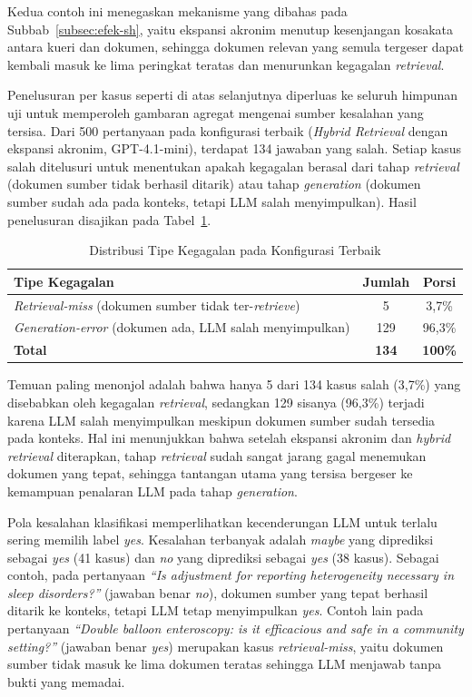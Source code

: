 Kedua contoh ini menegaskan mekanisme yang dibahas pada Subbab~\ref{subsec:efek-sh}, yaitu ekspansi akronim menutup kesenjangan kosakata antara kueri dan dokumen, sehingga dokumen relevan yang semula tergeser dapat kembali masuk ke lima peringkat teratas dan menurunkan kegagalan \textit{retrieval}.

Penelusuran per kasus seperti di atas selanjutnya diperluas ke seluruh himpunan uji untuk memperoleh gambaran agregat mengenai sumber kesalahan yang tersisa. Dari 500 pertanyaan pada konfigurasi terbaik (\textit{Hybrid Retrieval} dengan ekspansi akronim, GPT-4.1-mini), terdapat 134 jawaban yang salah. Setiap kasus salah ditelusuri untuk menentukan apakah kegagalan berasal dari tahap \textit{retrieval} (dokumen sumber tidak berhasil ditarik) atau tahap \textit{generation} (dokumen sumber sudah ada pada konteks, tetapi LLM salah menyimpulkan). Hasil penelusuran disajikan pada Tabel~\ref{tbl:tipe-kegagalan}.

\begin{table}[H]
\centering
\caption{Distribusi Tipe Kegagalan pada Konfigurasi Terbaik}
\label{tbl:tipe-kegagalan}
\begin{tabular}{lcc}
\toprule
\textbf{Tipe Kegagalan} & \textbf{Jumlah} & \textbf{Porsi} \\
\midrule
\textit{Retrieval-miss} (dokumen sumber tidak ter-\textit{retrieve}) & 5 & 3{,}7\% \\
\textit{Generation-error} (dokumen ada, LLM salah menyimpulkan) & 129 & 96{,}3\% \\
\midrule
\textbf{Total} & \textbf{134} & \textbf{100\%} \\
\bottomrule
\end{tabular}
\end{table}

Temuan paling menonjol adalah bahwa hanya 5 dari 134 kasus salah (3{,}7\%) yang disebabkan oleh kegagalan \textit{retrieval}, sedangkan 129 sisanya (96{,}3\%) terjadi karena LLM salah menyimpulkan meskipun dokumen sumber sudah tersedia pada konteks. Hal ini menunjukkan bahwa setelah ekspansi akronim dan \textit{hybrid retrieval} diterapkan, tahap \textit{retrieval} sudah sangat jarang gagal menemukan dokumen yang tepat, sehingga tantangan utama yang tersisa bergeser ke kemampuan penalaran LLM pada tahap \textit{generation}.

Pola kesalahan klasifikasi memperlihatkan kecenderungan LLM untuk terlalu sering memilih label \textit{yes}. Kesalahan terbanyak adalah \textit{maybe} yang diprediksi sebagai \textit{yes} (41 kasus) dan \textit{no} yang diprediksi sebagai \textit{yes} (38 kasus). Sebagai contoh, pada pertanyaan \textit{``Is adjustment for reporting heterogeneity necessary in sleep disorders?''} (jawaban benar \textit{no}), dokumen sumber yang tepat berhasil ditarik ke konteks, tetapi LLM tetap menyimpulkan \textit{yes}. Contoh lain pada pertanyaan \textit{``Double balloon enteroscopy: is it efficacious and safe in a community setting?''} (jawaban benar \textit{yes}) merupakan kasus \textit{retrieval-miss}, yaitu dokumen sumber tidak masuk ke lima dokumen teratas sehingga LLM menjawab tanpa bukti yang memadai.

